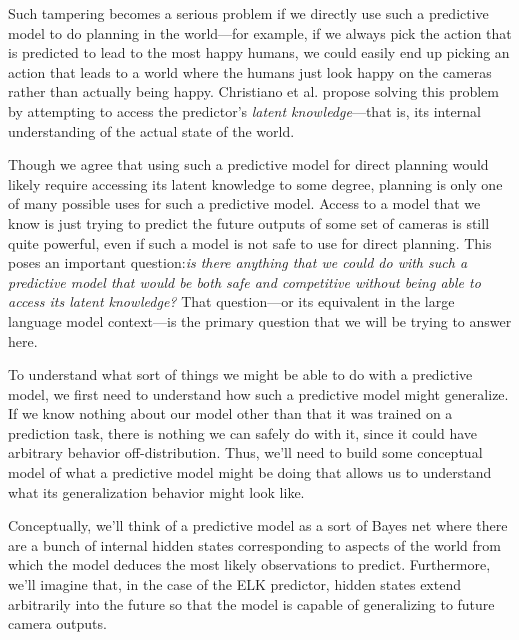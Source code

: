 \documentclass[
  onecolumn,
  natbib,
]{miri-tech-article}
\begin{document}
Such tampering becomes a serious problem if we directly use such a predictive model to do planning in the world---for example, if we always pick the action that is predicted to lead to the most happy humans, we could easily end up picking an action that leads to a world where the humans just look happy on the cameras rather than actually being happy. Christiano et al. propose solving this problem by attempting to access the predictor's \textit{latent knowledge}---that is, its internal understanding of the actual state of the world.

Though we agree that using such a predictive model for direct planning would likely require accessing its latent knowledge to some degree, planning is only one of many possible uses for such a predictive model. Access to a model that we know is just trying to predict the future outputs of some set of cameras is still quite powerful, even if such a model is not safe to use for direct planning. This poses an important question:\textit{is there anything that we could do with such a predictive model that would be both safe and competitive without being able to access its latent knowledge?} That question---or its equivalent in the large language model context---is the primary question that we will be trying to answer here.

To understand what sort of things we might be able to do with a predictive model, we first need to understand how such a predictive model might generalize. If we know nothing about our model other than that it was trained on a prediction task, there is nothing we can safely do with it, since it could have arbitrary behavior off-distribution. Thus, we'll need to build some conceptual model of what a predictive model might be doing that allows us to understand what its generalization behavior might look like.

Conceptually, we'll think of a predictive model as a sort of Bayes net\cite{wikipedia_bayesian_network} where there are a bunch of internal hidden states corresponding to aspects of the world from which the model deduces the most likely observations to predict. Furthermore, we'll imagine that, in the case of the ELK predictor, hidden states extend arbitrarily into the future so that the model is capable of generalizing to future camera outputs.
\end{document}
